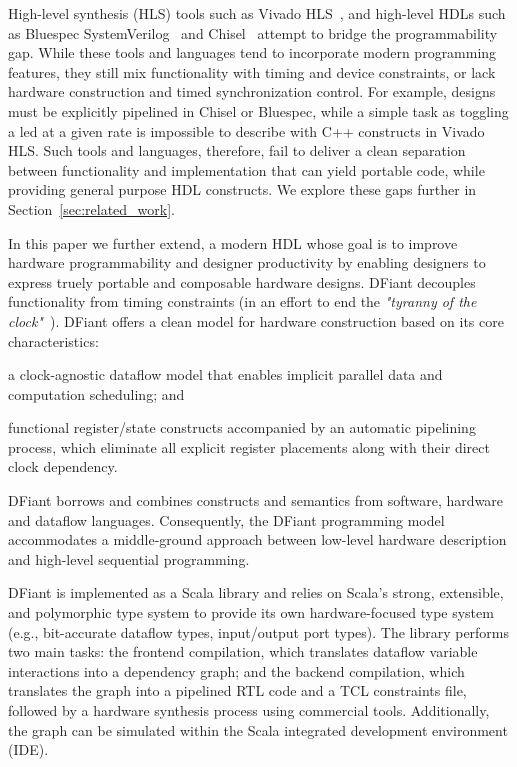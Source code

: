 High-level synthesis (HLS) tools such as Vivado HLS~\cite{Vivado2012}, and high-level HDLs such as Bluespec SystemVerilog~\cite{nikhil2004bluespec} and Chisel~\cite{Bachrach2012} attempt to bridge the programmability gap.
While these tools and languages tend to incorporate modern programming features, they still mix functionality with timing and device constraints, or lack hardware construction and timed synchronization control. For example, designs must be explicitly pipelined in Chisel or Bluespec, while a simple task as toggling a led at a given rate is impossible to describe with C++ constructs in Vivado HLS.
Such tools and languages, therefore, fail to deliver a clean separation between functionality and implementation that can yield portable code, while providing general purpose HDL constructs. We explore these gaps further in Section~\ref{sec:related_work}.


In this paper we further extend, a modern HDL whose goal is to improve hardware programmability and designer productivity by enabling designers to express truely portable and composable hardware designs.
DFiant decouples functionality from timing constraints (in an effort to end the \emph{"tyranny of the clock"}~\cite{Sutherland2012}). DFiant offers a clean model for hardware construction based on its core characteristics:
\begin{enumerate*}[label=(\roman*)]
\item
  a clock-agnostic dataflow model that enables implicit parallel data and computation scheduling; and
\item
  functional register/state constructs accompanied by an automatic pipelining process, which eliminate all explicit register placements along with their direct clock dependency.
\end{enumerate*} DFiant borrows and combines constructs and semantics from software, hardware and dataflow languages. Consequently, the DFiant programming model accommodates a middle-ground approach between low-level hardware description and high-level sequential programming. 

DFiant is implemented as a Scala library and relies on Scala's strong, extensible, and polymorphic type system to provide its own hardware-focused type system (e.g., bit-accurate dataflow types, input/output port types). The library performs two main tasks: the frontend compilation, which translates dataflow variable interactions into a dependency graph; and the backend compilation, which translates the graph into a pipelined RTL code and a TCL constraints file, followed by a hardware synthesis process using commercial tools. Additionally, the graph can be simulated within the Scala integrated development environment (IDE). 

